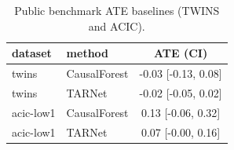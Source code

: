 \begin{table}[t]
\centering
\caption{Public benchmark ATE baselines (TWINS and ACIC).}
\label{tab:public_benchmarks}
\begin{tabular}{llc}
\toprule
dataset & method & ATE (CI) \\
\midrule
\midrule
twins & CausalForest & -0.03 [-0.13, 0.08] \\
\toprule
twins & TARNet & -0.02 [-0.05, 0.02] \\
acic-low1 & CausalForest & 0.13 [-0.06, 0.32] \\
acic-low1 & TARNet & 0.07 [-0.00, 0.16] \\
\bottomrule
\bottomrule
\end{tabular}
\end{table}